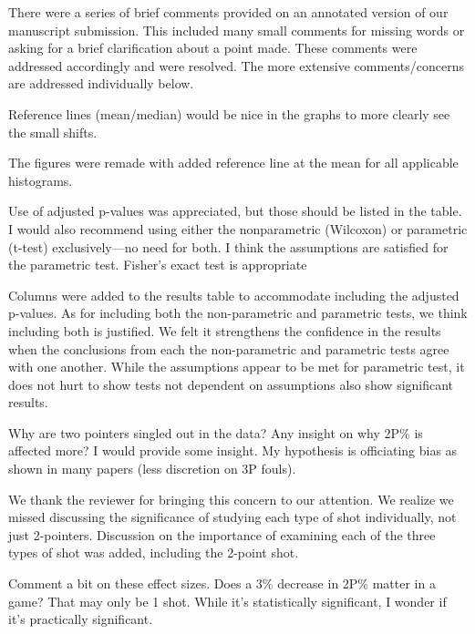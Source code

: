 \documentclass[12pt]{article}
\newenvironment{comment}%
{\begin{quoting}\noindent\small\it\ignorespaces%
  }{\end{quoting}}
\begin{document}
There were a series of brief comments provided on an annotated version of our manuscript submission. This included many small comments for missing words or asking for a brief clarification about a point made. These comments were addressed accordingly and were resolved. The more extensive comments/concerns are addressed individually below.

\begin{comment}
  Reference lines (mean/median) would be nice in the graphs to more clearly see the small shifts.
\end{comment}

The figures were remade with added reference line at the mean for all applicable histograms.
 
\begin{comment}
Use of adjusted p-values was appreciated, but those should be listed in the table.  I would also recommend using either the nonparametric (Wilcoxon) or parametric (t-test) exclusively—no need for both.  I think the assumptions are satisfied for the parametric test.  Fisher’s exact test is appropriate
\end{comment}

 Columns were added to the results table to accommodate including the adjusted p-values. As for including both the non-parametric and parametric tests, we think including both is justified. We felt it strengthens the confidence in the results when the conclusions from each the non-parametric and parametric tests agree with one another. While the assumptions appear to be met for parametric test, it does not hurt to show tests not dependent on assumptions also show significant results.
 
\begin{comment}
 Why are two pointers singled out in the data? Any insight on why 2P\% is affected more? I would provide some insight. My hypothesis is officiating bias as shown in many papers (less discretion on 3P fouls). 
\end{comment}

 We thank the reviewer for bringing this concern to our attention. We realize we missed discussing the significance of studying each type of shot individually, not just 2-pointers. Discussion on the importance of examining each of the three types of shot was added, including the 2-point shot.

\begin{comment}
Comment a bit on these effect sizes. Does a 3\% decrease in 2P\% matter in a game? That may only be 1 shot. While it's statistically significant, I wonder if it's practically significant.
\end{comment}
\end{document}
